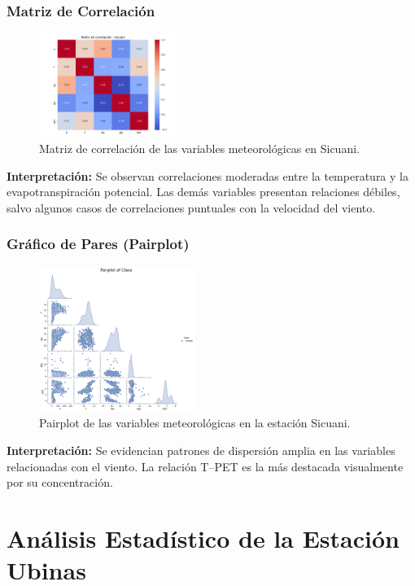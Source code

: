 \subsubsection*{Matriz de Correlación}
\begin{figure}[H]
\centering
\includegraphics[width=0.4\textwidth]{resultados/por_estacion_meteorologica/Sicuani/matriz_correlacion.png}
\caption{Matriz de correlación de las variables meteorológicas en Sicuani.}
\label{fig:sicuani_corr}
\end{figure}
\textbf{Interpretación:} Se observan correlaciones moderadas entre la temperatura y la evapotranspiración potencial. Las demás variables presentan relaciones débiles, salvo algunos casos de correlaciones puntuales con la velocidad del viento.

\subsubsection*{Gráfico de Pares (Pairplot)}
\begin{figure}[H]
\centering
\includegraphics[width=0.45\textwidth]{resultados/por_estacion_meteorologica/Sicuani/pairplot.png}
\caption{Pairplot de las variables meteorológicas en la estación Sicuani.}
\label{fig:sicuani_pairplot}
\end{figure}
\textbf{Interpretación:} Se evidencian patrones de dispersión amplia en las variables relacionadas con el viento. La relación T–PET es la más destacada visualmente por su concentración.


\section{Análisis Estadístico de la Estación Ubinas}

